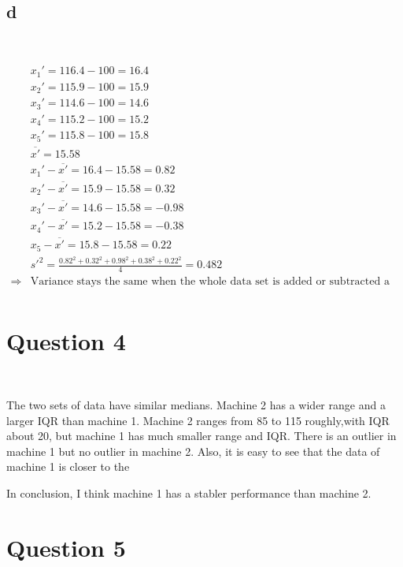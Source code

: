 \documentclass{article}
\begin{document}
~

\subsection*{d}

~

\begin{align*}
    &{x_1}'=116.4-100=16.4\\
    &{x_2}'=115.9-100=15.9\\
    &{x_3}'=114.6-100=14.6\\
    &{x_4}'=115.2-100=15.2\\
    &{x_5}'=115.8-100=15.8\\
    &\overline{x'}=15.58\\
    &{x_1}'-\overline{x'}=16.4-15.58=0.82\\
    &{x_2}'-\overline{x'}=15.9-15.58=0.32\\
    &{x_3}'-\overline{x'}=14.6-15.58=-0.98\\
    &{x_4}'-\overline{x'}=15.2-15.58=-0.38\\
    &{x_5}-\overline{x'}=15.8-15.58=0.22\\
    &{s'}^2=\frac{0.82^2+0.32^2+0.98^2+0.38^2+0.22^2}{4}=0.482\\
    \Rightarrow&\text{Variance stays the same when the whole data set is added or subtracted a certain value}\\
\end{align*}

\newpage

\section*{Question 4}

~

The two sets of data have similar medians. Machine 2 has a wider range and a larger IQR than machine 1. Machine 2 ranges from 85 to 115 roughly,with IQR about 20, but machine 1 has much smaller range and IQR. There is an outlier in machine 1 but no outlier in machine 2. Also, it is easy to see that the data of machine 1 is closer to the 

In conclusion, I think machine 1 has a stabler performance than machine 2.

\newpage

\section*{Question 5}
\end{document}
